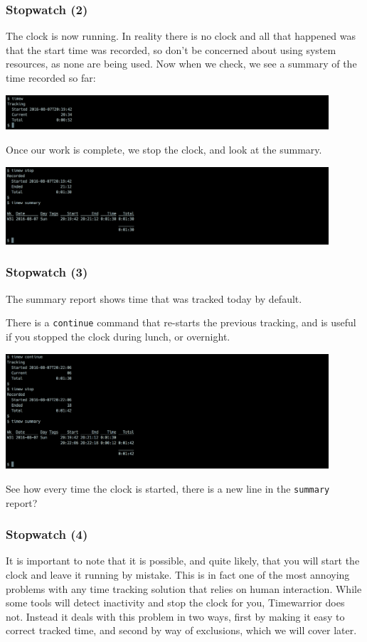 \documentclass[t,handout]{beamer}
\begin{document}
\begin{frame}[fragile]\frametitle{Stopwatch (2)}
    The clock is now running. In reality there is no clock and all that happened was that the start time was recorded, so don't be concerned about using system resources, as none are being used. Now when we check, we see a summary of the time recorded so far:

    \includegraphics[width=12cm]{images/tutorial5.png}

    Once our work is complete, we stop the clock, and look at the summary.

    \includegraphics[width=12cm]{images/tutorial6.png}
\end{frame}

\begin{frame}[fragile]\frametitle{Stopwatch (3)}
    The summary report shows time that was tracked today by default.

    There is a \verb=continue= command that re-starts the previous tracking, and is useful if you stopped the clock during lunch, or overnight.

    \includegraphics[width=12cm]{images/tutorial7.png}

    See how every time the clock is started, there is a new line in the \verb=summary= report?
\end{frame}

\begin{frame}[fragile]\frametitle{Stopwatch (4)}
    It is important to note that it is possible, and quite likely, that you will start the clock and leave it running by mistake. This is in fact one of the most annoying problems with any time tracking solution that relies on human interaction. While some tools will detect inactivity and stop the clock for you, Timewarrior does not. Instead it deals with this problem in two ways, first by making it easy to correct tracked time, and second by way of exclusions, which we will cover later.
\end{frame}
\end{document}
